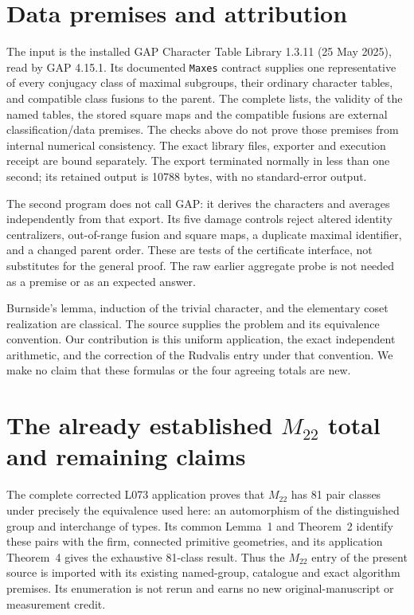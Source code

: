 \documentclass[11pt]{article}
\begin{document}
\section*{Data premises and attribution}
The input is the installed GAP Character Table Library 1.3.11
(25 May 2025), read by GAP 4.15.1. Its documented \texttt{Maxes}
contract supplies one representative of every conjugacy class of
maximal subgroups, their ordinary character tables, and compatible
class fusions to the parent. The complete lists, the validity of the
named tables, the stored square maps and the compatible fusions are
external classification/data premises. The checks above do not prove
those premises from internal numerical consistency. The exact library
files, exporter and execution receipt are bound separately. The export
terminated normally in less than one second; its retained output is
10788 bytes, with no standard-error output.

The second program does not call GAP: it derives the characters and
averages independently from that export. Its five damage controls
reject altered identity centralizers, out-of-range fusion and square
maps, a duplicate maximal identifier, and a changed parent order.
These are tests of the certificate interface, not substitutes for the
general proof. The raw earlier aggregate probe is not needed as a
premise or as an expected answer.

Burnside's lemma, induction of the trivial character, and the elementary
coset realization are classical. The source supplies the problem and
its equivalence convention. Our contribution is this uniform application,
the exact independent arithmetic, and the correction of the Rudvalis
entry under that convention. We make no claim that these formulas or
the four agreeing totals are new.

\section*{The already established $M_{22}$ total and remaining claims}
The complete corrected L073 application proves that $M_{22}$ has
81 pair classes under precisely the equivalence used here: an
automorphism of the distinguished group and interchange of types.
Its common Lemma~1 and Theorem~2 identify these pairs with the firm,
connected primitive geometries, and its application Theorem~4 gives
the exhaustive 81-class result. Thus the $M_{22}$ entry of the present
source is imported with its existing named-group, catalogue and exact
algorithm premises. Its enumeration is not rerun and earns no new
original-manuscript or measurement credit.
\end{document}
